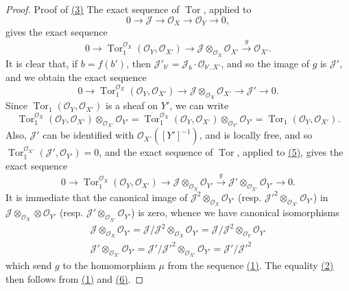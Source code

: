 \documentclass{article}
\theoremstyle{plain}
\theoremstyle{definition}
\newcommand{\scr}[1]{{\mathscr{#1}}}
\DeclareMathOperator{\Tor}{Tor}
\begin{document}
\begin{proof}{Proof of {\hyperref[section15equation3]{(3)}}}
  The exact sequence of $\Tor$, applied to
  \[
    0\to\scr{J}\to\scr{O}_X\to\scr{O}_Y\to0,
  \]
  gives the exact sequence
  \[
    0 \to \Tor_1^{\scr{O}_X}(\scr{O}_Y,\scr{O}_{X'}) \to \scr{J}\otimes_{\scr{O}_X}\scr{O}_{X'} \xrightarrow{g} \scr{O}_{X'}.
  \]
  It is clear that, if $b=f(b')$, then $\scr{J}'_{b'}=\scr{J}_b\cdot\scr{O}_{b',X'}$, and so the image of $g$ is $\scr{J}'$, and we obtain the exact sequence
  \[
  \label{section15equation5}
    0 \to \Tor_1^{\scr{O}_X}(\scr{O}_Y,\scr{O}_{X'}) \to \scr{J}\otimes_{\scr{O}_X}\scr{O}_{X'} \to \scr{J}' \to 0.
    \tag{5}
  \]
  Since $\Tor_1(\scr{O}_Y,\scr{O}_{X'})$ is a sheaf on $Y'$, we can write
  \[
    \Tor_1^{\scr{O}_X}(\scr{O}_Y,\scr{O}_{X'})\otimes_{\scr{O}_{X'}}\scr{O}_{Y'}
    = \Tor_1^{\scr{O}_X}(\scr{O}_Y,\scr{O}_{X'})\otimes_{\scr{O}_{Y'}}\scr{O}_{Y'}
    = \Tor_1(\scr{O}_Y,\scr{O}_{X'}).
  \]
  Also, $\scr{J}'$ can be identified with $\scr{O}_{X'}([Y']^{-1})$, and is locally free, and so $\Tor_1^{\scr{O}_{X'}}(\scr{J}',\scr{O}_{Y'}) = 0$, and the exact sequence of $\Tor$, applied to \hyperref[section15equation5]{(5)}, gives the exact sequence
  \[
  \label{section15equation6}
    0 \to \Tor_1^{\scr{O}_X}(\scr{O}_Y,\scr{O}_{X'}) \to \scr{J}\otimes_{\scr{O}_X}\scr{O}_{Y'} \xrightarrow{g} \scr{J}'\otimes_{\scr{O}_{X'}}\scr{O}_{Y'} \to 0.
    \tag{6}
  \]
  It is immediate that the canonical image of $\scr{J}^2\otimes_{\scr{O}_X}\scr{O}_{Y'}$ (resp. $\scr{J}'^2\otimes_{\scr{O}_{X'}}\scr{O}_{Y'}$) in $\scr{J}\otimes_{\scr{O}_X}\otimes\scr{O}_{Y'}$ (resp. $\scr{J}'\otimes_{\scr{O}_{X'}}\scr{O}_{Y'}$) is zero, whence we have canonical isomorphisms
  \begin{gather*}
    \scr{J}\otimes_{\scr{O}_X}\scr{O}_{Y'}
    = \scr{J}/\scr{J}^2\otimes_{\scr{O}_X}\scr{O}_{Y'}
    = \scr{J}/\scr{J}^2\otimes_{\scr{O}_Y}\scr{O}_{Y'}
  \\\scr{J}'\otimes_{\scr{O}_{X'}}\scr{O}_{Y'}
    = \scr{J}'/\scr{J}'^2\otimes_{\scr{O}_{X'}}\scr{O}_{Y'}
    = \scr{J}'/\scr{J}'^2
  \end{gather*}
  which send $g$ to the homomorphism $\mu$ from the sequence \hyperref[section15equation1]{(1)}.
  The equality \hyperref[section15equation2]{(2)} then follows from \hyperref[section15equation1]{(1)} and \hyperref[section15equation6]{(6)}.


\end{proof}
\end{document}
